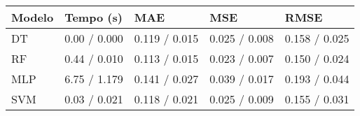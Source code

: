 \begin{tabular}{lllll}
\toprule
Modelo & Tempo (s) & MAE & MSE & RMSE \\
\midrule
DT & 0.00 / 0.000 & 0.119 / 0.015 & 0.025 / 0.008 & 0.158 / 0.025 \\
RF & 0.44 / 0.010 & 0.113 / 0.015 & 0.023 / 0.007 & 0.150 / 0.024 \\
MLP & 6.75 / 1.179 & 0.141 / 0.027 & 0.039 / 0.017 & 0.193 / 0.044 \\
SVM & 0.03 / 0.021 & 0.118 / 0.021 & 0.025 / 0.009 & 0.155 / 0.031 \\
\bottomrule
\end{tabular}
